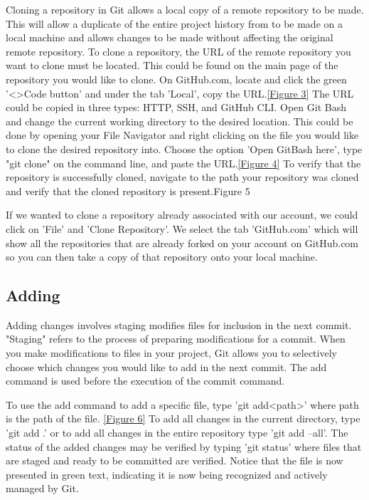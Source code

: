 \documentclass[10pt,twocolumn]{article}
\begin{document}
Cloning a repository in Git allows a local copy of a remote repository to be made. This will allow a duplicate of the entire project history from to be made on a local machine and allows changes to be made without affecting the original remote repository. 
To clone a repository, the URL of the remote repository you want to clone must be located. This could be found on the main page of the repository you would like to clone. On GitHub.com, locate and click the green '<>Code button' and under the tab 'Local', copy the URL.\ref{Figure 3} The URL could be copied in three types: HTTP, SSH, and GitHub CLI.  Open Git Bash and change the current working directory to the desired location. This could be done by opening your File Navigator and right clicking on the file you would like to clone the desired repository into. Choose the option 'Open GitBash here', type "git clone" on the command line, and paste the URL.\ref{Figure 4} To verify that the repository is successfully cloned, navigate to the path your repository was cloned and verify that the cloned repository is present.{Figure 5}

If we wanted to clone a repository already associated with our account, we could click on 'File' and 'Clone Repository'. We select the tab 'GitHub.com' which will show all the repositories that are already forked on your account on GitHub.com so you can then take a copy of that repository onto your local machine.





\subsection{Adding}
Adding changes involves staging modifies files for inclusion in the next commit. "Staging" refers to the process of preparing modifications for a commit. When you make modifications to files in your project, Git allows you to selectively choose which changes you would like to add in the next commit. The add command is used before the execution of the commit command. 

To use the add command to add a specific file, type 'git add<path>' where path is the path of the file. \ref{Figure 6} To add all changes in the current directory, type 'git add .' or to add all changes in the entire repository type 'git add --all'. The status of the added changes may be verified by typing 'git status' where files that are staged and ready to be committed are verified. Notice that the file is now presented in green text, indicating it is now being recognized and actively managed by Git. 
\end{document}
